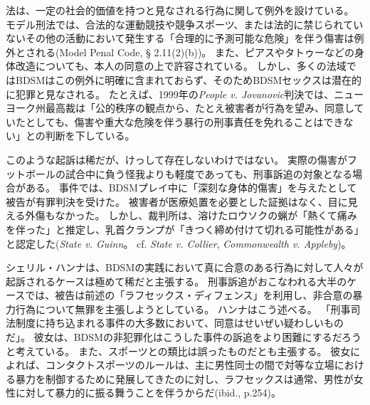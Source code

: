 \documentclass[paper=a4,book,openany]{jlreq}
\begin{document}
法は、一定の社会的価値を持つと見なされる行為に関して例外を設けている。
モデル刑法では、合法的な運動競技や競争スポーツ、または法的に禁じられていないその他の活動において発生する「合理的に予測可能な危険」を伴う傷害は例外とされる(Model Penal Code, § 2.11(2)(b))。
また、ピアスやタトゥーなどの身体改造についても、本人の同意の上で許容されている。
しかし、多くの法域ではBDSMはこの例外に明確に含まれておらず、そのためBDSMセックスは潜在的に犯罪と見なされる。
たとえば、1999年の\emph{People v. Jovanovic}判決では、ニューヨーク州最高裁は「公的秩序の観点から、たとえ被害者が行為を望み、同意していたとしても、傷害や重大な危険を伴う暴行の刑事責任を免れることはできない」との判断を下している。

このような起訴は稀だが、けっして存在しないわけではない。
実際の傷害がフットボールの試合中に負う怪我よりも軽度であっても、刑事訴追の対象となる場合がある。
事件では、BDSMプレイ中に「深刻な身体的傷害」を与えたとして被告が有罪判決を受けた。
被害者が医療処置を必要とした証拠はなく、目に見える外傷もなかった。
しかし、裁判所は、溶けたロウソクの蝋が「熱くて痛みを伴った」と推定し、乳首クランプが「きつく締め付けて切れる可能性がある」と認定した(\emph{State v. Guinn}。
cf.  \emph{State v. Collier}, \emph{Commonwealth v. Appleby})。

シェリル・ハンナは、BDSMの実践において真に合意のある行為に対して人々が起訴されるケースは極めて稀だと主張する。
刑事訴追がおこなわれる大半のケースでは、被告は前述の「ラフセックス・ディフェンス」を利用し、非合意の暴力行為について無罪を主張しようとしている。
ハンナはこう述べる。
「刑事司法制度に持ち込まれる事件の大多数において、同意はせいぜい疑わしいものだ」\citep[p.248]{hanna01:_sex_is_not_sport}。
彼女は、BDSMの非犯罪化はこうした事件の訴追をより困難にするだろうと考えている。
また、スポーツとの類比は誤ったものだとも主張する。
彼女によれば、コンタクトスポーツのルールは、主に男性同士の間で対等な立場における暴力を制御するために発展してきたのに対し、ラフセックスは通常、男性が女性に対して暴力的に振る舞うことを伴うからだ(ibid., p.254)。
\end{document}
